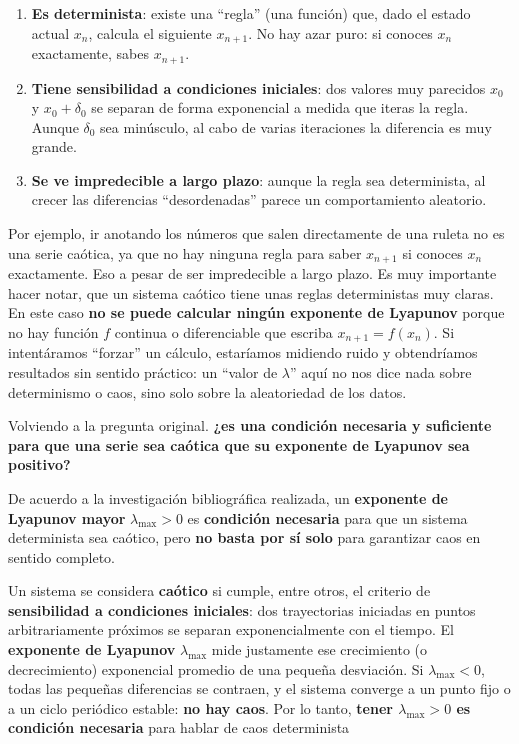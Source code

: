 \documentclass[
  10pt,
  a4paper,
  DIV=11,
  numbers=noendperiod,
  open=any]{scrreprt}
\providecommand{\tightlist}{%
  \setlength{\itemsep}{0pt}\setlength{\parskip}{0pt}}
\numberwithin{equation}{chapter}
\numberwithin{equation}{section}
\renewcommand{\[}{\begin{equation}}
\renewcommand{\]}{\end{equation}}
\begin{document}
\begin{enumerate}
\def\labelenumi{\arabic{enumi}.}
\tightlist
\item
  \textbf{Es determinista}: existe una ``regla'' (una función) que, dado
  el estado actual \(x_n\), calcula el siguiente \(x_{n+1}\). No hay
  azar puro: si conoces \(x_n\) exactamente, sabes \(x_{n+1}\).\\
\item
  \textbf{Tiene sensibilidad a condiciones iniciales}: dos valores muy
  parecidos \(x_0\) y \(x_0 + \delta_0\) se separan de forma exponencial
  a medida que iteras la regla. Aunque \(\delta_0\) sea minúsculo, al
  cabo de varias iteraciones la diferencia es muy grande.\\
\item
  \textbf{Se ve impredecible a largo plazo}: aunque la regla sea
  determinista, al crecer las diferencias ``desordenadas'' parece un
  comportamiento aleatorio.
\end{enumerate}

Por ejemplo, ir anotando los números que salen directamente de una
ruleta no es una serie caótica, ya que no hay ninguna regla para saber
\(x_{n+1}\) si conoces \(x_n\) exactamente. Eso a pesar de ser
impredecible a largo plazo. Es muy importante hacer notar, que un
sistema caótico tiene unas reglas deterministas muy claras. En este caso
\textbf{no se puede calcular ningún exponente de Lyapunov} porque no hay
función \(f\) continua o diferenciable que escriba \(x_{n+1} = f(x_n)\).
Si intentáramos ``forzar'' un cálculo, estaríamos midiendo ruido y
obtendríamos resultados sin sentido práctico: un ``valor de
\(\lambda\)'' aquí no nos dice nada sobre determinismo o caos, sino solo
sobre la aleatoriedad de los datos.

Volviendo a la pregunta original. \textbf{¿es una condición necesaria y
suficiente para que una serie sea caótica que su exponente de Lyapunov
sea positivo?}

De acuerdo a la investigación bibliográfica realizada, un
\textbf{exponente de Lyapunov mayor} \(\lambda_{\max} > 0\) es
\textbf{condición necesaria} para que un sistema determinista sea
caótico, pero \textbf{no basta por sí solo} para garantizar caos en
sentido completo.

Un sistema se considera \textbf{caótico} si cumple, entre otros, el
criterio de \textbf{sensibilidad a condiciones iniciales}: dos
trayectorias iniciadas en puntos arbitrariamente próximos se separan
exponencialmente con el tiempo. El \textbf{exponente de Lyapunov}
\(\lambda_{\max}\) mide justamente ese crecimiento (o decrecimiento)
exponencial promedio de una pequeña desviación. Si
\(\lambda_{\max} < 0\), todas las pequeñas diferencias se contraen, y el
sistema converge a un punto fijo o a un ciclo periódico estable:
\textbf{no hay caos}. Por lo tanto, \textbf{tener \(\lambda_{\max} > 0\)
es condición necesaria} para hablar de caos determinista
\end{document}
